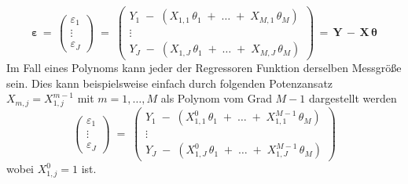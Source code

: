 \begin{equation}
\boldsymbol{\varepsilon} \, =  \, \left(
\begin{array}{c}
\varepsilon_1\\
\vdots \\
\varepsilon_J
\end{array}
\right)  \; = \;
\left(
\begin{array}{c}
 Y_{1} \; - \; (X_{1,1} \, \theta_1  \; + \; \dots  \; + \;  X_{M,1} \, \theta_{M})\\
\vdots \\
 Y_{J} \; - \; (X_{1,J} \, \theta_1 \; + \; \dots  \; + \;  X_{M,J} \, \theta_{M})
\end{array}\right)  \, = \,
\mathbf{Y} \, -  \, \mathbf{X} \, \boldsymbol{\theta}
\end{equation}
Im Fall eines Polynoms kann jeder der Regressoren Funktion derselben Messgröße sein.
Dies kann beispielsweise einfach
durch folgenden Potenzansatz $X_{m,j} = X_{1,j}^{m-1}$ mit $m = 1,\dots,M$ als
Polynom vom Grad $M-1$ dargestellt werden
\begin{equation}
\left(
\begin{array}{c}
\varepsilon_1\\
\vdots \\
\varepsilon_J
\end{array}
\right)  \; = \;
\left(
\begin{array}{c}
 Y_{1} \; - \; (X_{1,1}^0 \, \theta_1  \; + \; \dots  \; + \;  X_{1,1}^{M-1} \, \theta_{M})\\
\vdots \\
 Y_{J} \; - \; (X_{1,J}^0 \, \theta_1 \; + \; \dots  \; + \;  X_{1,J}^{M-1} \, \theta_{M})
\end{array}\right)
\end{equation}
wobei $X_{1,j}^0 = 1$ ist.

